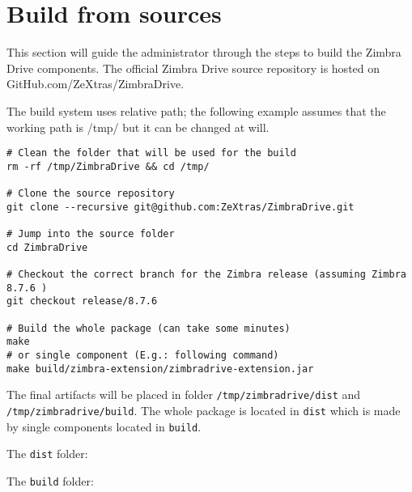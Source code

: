 \section{Build from sources}
This section will guide the administrator through the steps to build the Zimbra Drive components.
The official Zimbra Drive source repository is hosted on GitHub.com/ZeXtras/ZimbraDrive.

The build system uses relative path; the following example assumes that the working path is /tmp/
but it can be changed at will.
\begin{verbatim}
# Clean the folder that will be used for the build
rm -rf /tmp/ZimbraDrive && cd /tmp/

# Clone the source repository
git clone --recursive git@github.com:ZeXtras/ZimbraDrive.git

# Jump into the source folder
cd ZimbraDrive

# Checkout the correct branch for the Zimbra release (assuming Zimbra 8.7.6 )
git checkout release/8.7.6

# Build the whole package (can take some minutes)
make
# or single component (E.g.: following command)
make build/zimbra-extension/zimbradrive-extension.jar

\end{verbatim}

The final artifacts will be placed in folder \texttt{/tmp/zimbradrive/dist} and \texttt{/tmp/zimbradrive/build}.
The whole package is located in \texttt{dist} which is made by single components located in \texttt{build}.

The \texttt{dist} folder:

The \texttt{build} folder:

